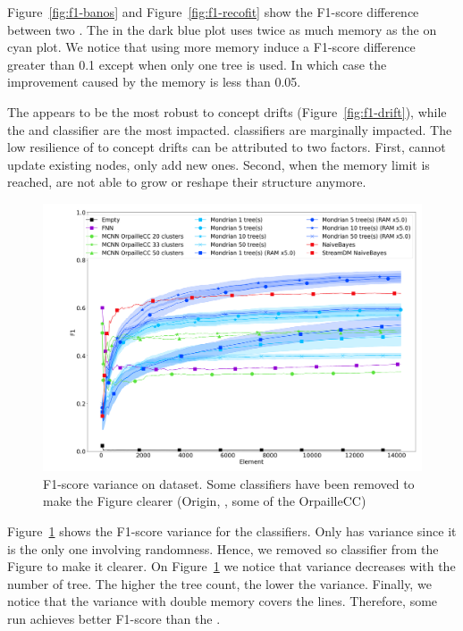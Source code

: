 Figure~\ref{fig:f1-banos} and Figure~\ref{fig:f1-recofit} show the F1-score
difference between two \mondrianforest. The \mondrianforest in the dark blue
plot uses twice as much memory as the on cyan plot. We notice that using more
memory induce a F1-score difference greater than 0.1 except when only one tree
is used. In which case the improvement caused by the memory is less than 0.05.

The \hoeffdingtree appears to be the most robust to concept drifts
(Figure~\ref{fig:f1-drift}), while the \mondrianforest and \naivebayes
classifier are the most impacted. \mcnn classifiers are marginally impacted.
The low resilience of \mondrianforest to concept drifts can be attributed to
two factors. First, \mondrianforest cannot update existing nodes, only add new ones.
Second, when the memory limit is reached, \mondrianforest are not able to grow
or reshape their structure anymore.

\begin{figure}
		\includegraphics[width=\linewidth]{figures/results/banos_6_f1_std.png}
		\caption{F1-score variance on \banosdataset dataset. Some classifiers
		have been removed to make the Figure clearer (\mcnn Origin,
		\hoeffdingtree, some of the \mcnn OrpailleCC)}
		\label{fig:f1-variance}
\end{figure}

Figure~\ref{fig:f1-variance} shows the F1-score variance for the classifiers.
Only \mondrianforest has variance since it is the only one involving
randomness. Hence, we removed so classifier from the Figure to make it clearer.
On Figure~\ref{fig:f1-variance} we notice that \mondrianforest variance
decreases with the number of tree. The higher the tree count, the lower the
variance. Finally, we notice that the \mondrianforest variance with double
memory covers the \naivebayes lines. Therefore, some \mondrianforest run
achieves better F1-score than the \naivebayes.

